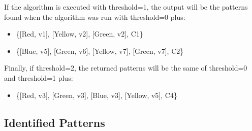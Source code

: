 \documentclass[11pt]{article} %
\begin{document}
If the algorithm is executed with  threshold=1, the output will be the patterns found when the algorithm was run with threshold=0 plus:
\begin{itemize}
\item \{[Red, v1], [Yellow, v2], [Green, v2], C1\}
\item \{[Blue, v5], [Green, v6], [Yellow, v7], [Green, v7], C2\}
\end{itemize}

Finally, if threshold=2, the returned patterns will be the same of threshold=0 and threshold=1 plus:
\begin{itemize}
\item \{[Red, v3], [Green, v3], [Blue, v3], [Yellow, v5], C4\}
\end{itemize}

\subsection{Identified Patterns}
\end{document}
